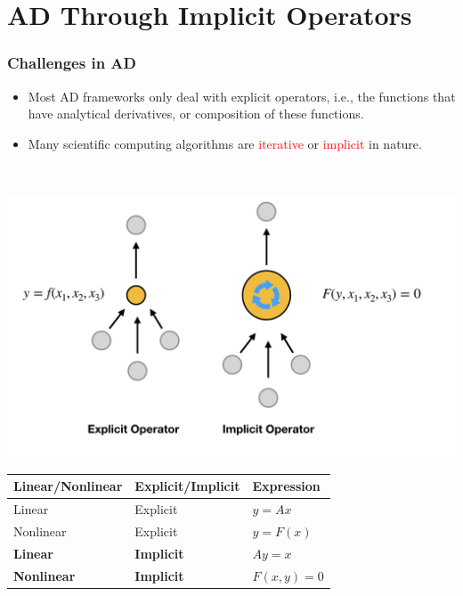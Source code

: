 \documentclass{beamer}
\begin{document}
\section{AD Through Implicit Operators}

\begin{frame}
	\frametitle{Challenges in AD}


	\begin{minipage}[t]{0.49\textwidth}
		\vspace{-3cm}
		\begin{itemize}
			\item Most AD frameworks only deal with explicit operators, i.e., the functions that have analytical derivatives, or composition of these functions.
			\item Many scientific computing algorithms are \textcolor{red}{iterative} or \textcolor{red}{implicit} in nature.
		\end{itemize}
	\end{minipage}~
	\begin{minipage}[t]{0.49\textwidth}
		\includegraphics[width=1.0\textwidth]{figures/sim.png}
	\end{minipage}

	\begin{table}[]
		\begin{tabular}{@{}lll@{}}
			\toprule
			Linear/Nonlinear   & Explicit/Implicit & Expression   \\ \midrule
			Linear             & Explicit          & $y=Ax$       \\
			Nonlinear          & Explicit          & $y = F(x)$   \\
			\textbf{Linear}    & \textbf{Implicit} & $Ay = x$     \\
			\textbf{Nonlinear} & \textbf{Implicit} & $F(x,y) = 0$ \\ \bottomrule
		\end{tabular}
	\end{table}
\end{frame}
\end{document}
